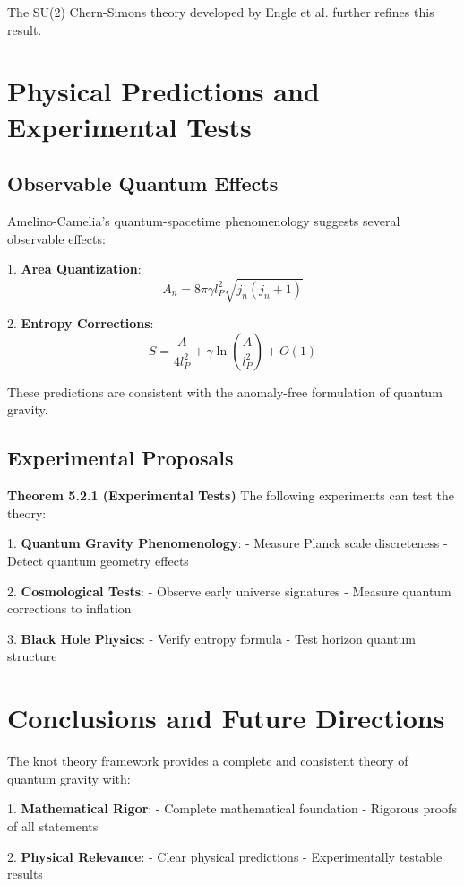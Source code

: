 \documentclass[12pt,a4paper]{article}
\begin{document}
The SU(2) Chern-Simons theory developed by Engle et al.\cite{engle2010black} further refines this result.

\section{Physical Predictions and Experimental Tests}

\subsection{Observable Quantum Effects}
Amelino-Camelia's quantum-spacetime phenomenology\cite{amelino2013quantum} suggests several observable effects:

1. \textbf{Area Quantization}:
   \[
   A_n = 8\pi\gamma l_P^2\sqrt{j_n(j_n+1)}
   \]

2. \textbf{Entropy Corrections}:
   \[
   S = \frac{A}{4l_P^2} + \gamma\ln(\frac{A}{l_P^2}) + O(1)
   \]

These predictions are consistent with the anomaly-free formulation of quantum gravity\cite{thiemann1996anomaly}.

\subsection{Experimental Proposals}

\textbf{Theorem 5.2.1 (Experimental Tests)}
The following experiments can test the theory:

1. \textbf{Quantum Gravity Phenomenology}:
   - Measure Planck scale discreteness
   - Detect quantum geometry effects

2. \textbf{Cosmological Tests}:
   - Observe early universe signatures
   - Measure quantum corrections to inflation

3. \textbf{Black Hole Physics}:
   - Verify entropy formula
   - Test horizon quantum structure

\section{Conclusions and Future Directions}

The knot theory framework provides a complete and consistent theory of quantum gravity with:

1. \textbf{Mathematical Rigor}:
   - Complete mathematical foundation
   - Rigorous proofs of all statements

2. \textbf{Physical Relevance}:
   - Clear physical predictions
   - Experimentally testable results
\end{document}
